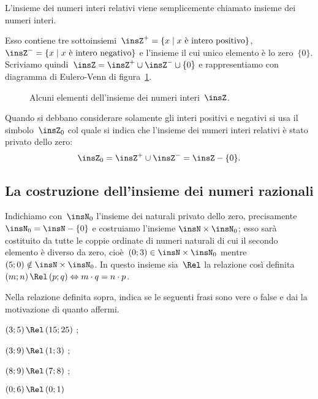 \osservazione L'insieme dei numeri interi relativi viene semplicemente chiamato insieme dei numeri interi.

Esso contiene tre sottoinsiemi~$\insZ^{+} =\{x \mid  x \text{ è intero positivo}\}$, $\insZ^{-} =\{x \mid  x \text{ è intero negativo}\}$
e l'insieme il cui unico elemento è lo zero~$\{0\}$. Scriviamo quindi~$\insZ = \insZ^{+}\cup \insZ^{-}\cup\{0\}$ e rappresentiamo con diagramma di Eulero-Venn di figura~\ref{fig:E.4}.

\begin{figure}[hbt]
 \centering
 \caption{Alcuni elementi dell'insieme dei numeri interi~$\insZ$.}\label{fig:E.4}
\end{figure}

Quando si debbano considerare solamente gli interi positivi e negativi si usa il simbolo~$\insZ_0$ col quale si indica che l'insieme dei numeri interi
relativi è stato privato dello zero:
\[\insZ_0 = \insZ^{+}\cup\insZ^{-} = \insZ -\{0\}.\]

\ovalbox{\risolvii \ref{ese:E.1}, \ref{ese:E.2}}

\subsection{La costruzione dell'insieme dei numeri razionali}\label{sect:ins_numeri_razionali}

Indichiamo con~$\insN_{0}$ l'insieme dei naturali privato dello zero, precisamente~$\insN_{0}=\insN-\{0\}$ e costruiamo l'insieme
$\insN\times\insN_{0}$; esso sarà costituito da tutte le coppie ordinate di numeri naturali di cui il secondo elemento è diverso da zero,
cioè~$(0;3)\in \insN\times\insN_{0}$ mentre~$(5;0)\notin\insN\times \insN_{0}$.
In questo insieme sia~$\Rel$ la relazione così definita~$(m;n)\,\Rel\, (p;q) \Leftrightarrow m\cdot q=n\cdot p$.

\begin{exrig}
 \begin{esempio}
\TabPositions{4cm}
Nella relazione definita sopra, indica se le seguenti frasi sono vere o false e dai la motivazione di quanto affermi.
\begin{itemize*}
\item $(3;5)\,\Rel\, (15;25)$ \tab\boxV\quad\boxF\qquad\dotfill;
\item $(3;9)\,\Rel\, (1;3)$ \tab\boxV\quad\boxF\qquad\dotfill;
\item $(8;9)\,\Rel\, (7;8)$ \tab\boxV\quad\boxF\qquad\dotfill;
\item $(0;6)\,\Rel\, (0;1)$ \tab\boxV\quad\boxF\qquad\dotfill
\end{itemize*}
 \end{esempio}
\end{exrig}

